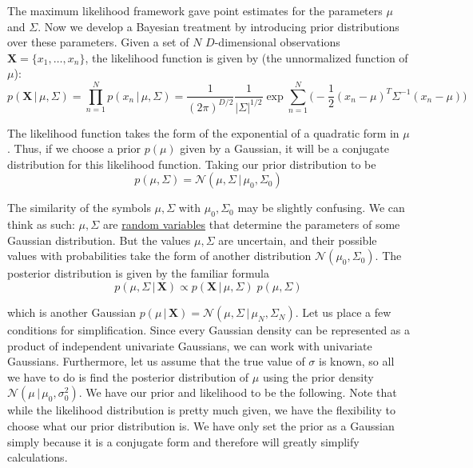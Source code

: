   The maximum likelihood framework gave point estimates for the parameters $\mu$ and $\Sigma$. Now we develop a Bayesian treatment by introducing prior distributions over these parameters. Given a set of $N$ $D$-dimensional observations $\mathbf{X} = \{x_1, \ldots, x_n\}$, the likelihood function is given by (the unnormalized function of $\mu$):
  \begin{equation}
    p(\mathbf{X}\,|\,\mu, \Sigma) = \prod_{n=1}^N p(x_n\,|\,\mu, \Sigma) = \frac{1}{(2\pi)^{D/2}} \frac{1}{|\Sigma|^{1/2}} \exp \sum_{n=1}^N \bigg(-\frac{1}{2} (x_n - \mu)^T \Sigma^{-1} (x_n - \mu)\bigg)
  \end{equation}

  The likelihood function takes the form of the exponential of a quadratic form in $\mu$. Thus, if we choose a prior $p(\mu)$ given by a Gaussian, it will be a conjugate distribution for this likelihood function. Taking our prior distribution to be
  \begin{equation}
    p(\mu, \Sigma) = \mathcal{N}(\mu, \Sigma\,|\,\mu_0, \Sigma_0)
  \end{equation}

  The similarity of the symbols $\mu, \Sigma$ with $\mu_0, \Sigma_0$ may be slightly confusing. We can think as such: $\mu, \Sigma$ are \hyperref[prob-def:random-variable]{random variables} that determine the parameters of some Gaussian distribution. But the values $\mu, \Sigma$ are uncertain, and their possible values with probabilities take the form of another distribution $\mathcal{N}(\mu_0, \Sigma_0)$. The posterior distribution is given by the familiar formula
  \begin{equation}
    p(\mu, \Sigma\,|\,\mathbf{X}) \propto p(\mathbf{X}\,|\,\mu, \Sigma) \; p(\mu, \Sigma)
  \end{equation}

  which is another Gaussian $p(\mu\,|\,\mathbf{X}) = \mathcal{N}(\mu, \Sigma\,|\, \mu_N, \Sigma_N)$. Let us place a few conditions for simplification. Since every Gaussian density can be represented as a product of independent univariate Gaussians, we can work with univariate Gaussians. Furthermore, let us assume that the true value of $\sigma$ is known, so all we have to do is find the posterior distribution of $\mu$ using the prior density $\mathcal{N}(\mu\,|\,\mu_0, \sigma_0^2)$. We have our prior and likelihood to be the following. Note that while the likelihood distribution is pretty much given, we have the flexibility to choose what our prior distribution is. We have only set the prior as a Gaussian simply because it is a conjugate form and therefore will greatly simplify calculations.

